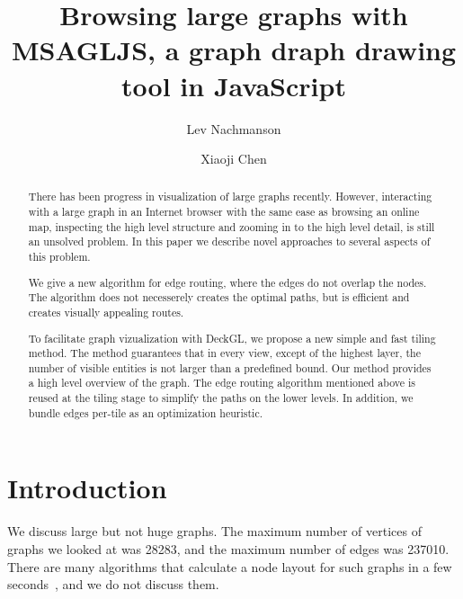 \documentclass{gd-llncs}
\begin{document}
\title{Browsing large graphs with MSAGLJS, a graph draph drawing tool in JavaScript }
\author{%
  Lev Nachmanson  \and
  Xiaoji Chen
}%
\maketitle


\begin{abstract}
  There has been progress in visualization of large graphs recently. However, interacting with a large graph in an Internet browser with the same ease as browsing an online map, inspecting the high level structure and zooming in to the high level detail, is still an unsolved problem. In this paper we describe novel approaches to several aspects of this problem.

  We give a new algorithm for edge routing, where the edges do not overlap the nodes. The algorithm does not necesserely creates the optimal paths, but is efficient and creates visually appealing routes.

  To facilitate graph vizualization with DeckGL, we propose a new simple and fast tiling method. The method guarantees that in every view, except of the highest layer, the number of visible entities is not larger than a predefined bound.
  Our method provides a high level overview of the graph.
  The edge routing algorithm mentioned above is reused at the tiling stage to simplify the paths on the lower levels. In addition, we bundle edges per-tile as an optimization heuristic.
\end{abstract}


\section*{Introduction}

\label{sec:intro}

We discuss large but not huge graphs. The maximum number of vertices of graphs we looked at was 28283, and the maximum number of edges was 237010. There are many algorithms that calculate a node layout for such graphs in a few seconds~\cite{hu2015visualizing,brandes2007eigensolver}, and we do not discuss them.
\end{document}
